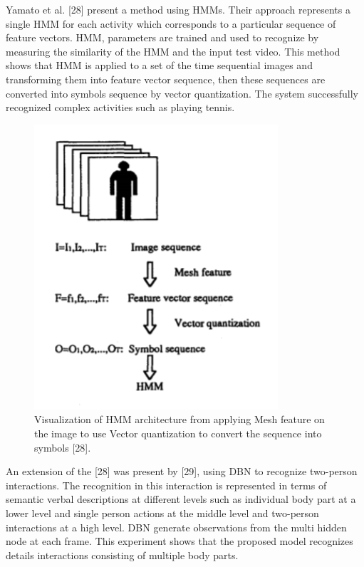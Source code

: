 Yamato et al. [28] present a method using HMMs. Their approach represents a single HMM for each activity which corresponds to a particular sequence of feature vectors. HMM, parameters are trained and used to recognize by measuring the similarity of the HMM and the input test video. This method shows that HMM is applied to a set of the time sequential images and transforming them into feature vector sequence, then these sequences are converted into symbols sequence by vector quantization. The system successfully recognized complex activities such as playing tennis.\\

\begin{figure}[ht]
\centering
\includegraphics{Figures/qw}
\decoRule
\caption[Visualization of HMM architecture from applying Mesh feature on the image to use Vector quantization to convert the sequence into symbols "28".]{Visualization of HMM architecture from applying Mesh feature on the image to use Vector quantization to convert the sequence into symbols [28].}
\label{fig:la}
\end{figure}

An extension of the [28] was present by [29], using DBN to recognize two-person interactions. The recognition in this interaction is represented in terms of semantic verbal descriptions at different levels such as individual body part at a lower level and single person actions at the middle level and two-person interactions at a high level. DBN generate observations from the multi hidden node at each frame. This experiment shows that the proposed model recognizes details interactions consisting of multiple body parts.\\

